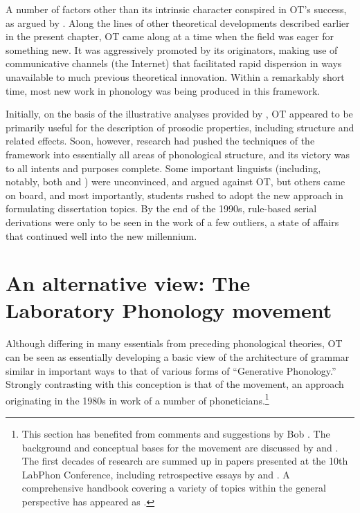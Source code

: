 A number of factors other than its intrinsic character conspired in
OT's success, as argued by \citet{griffiths19:expansion-ot}.  Along
the lines of other theoretical developments described earlier in the
present chapter, OT came along at a time when the field was eager for
something new. It was aggressively promoted by its originators, making
use of communicative channels (the Internet) that facilitated rapid
dispersion in ways unavailable to much previous theoretical
innovation.  Within a remarkably short time, most new work in
phonology was being produced in this framework.

Initially, on the basis of the illustrative analyses provided by
\citet{prince:smolensky:optimality}, OT appeared to be primarily
useful for the description of prosodic properties, including 
structure and related effects. Soon, however, research had pushed the
techniques of the framework into essentially all areas of phonological
structure, and its victory was to all intents and purposes
complete. Some important linguists (including, notably, both {\Chomsky}
and {\Halle}) were unconvinced, and argued against OT, but others came on
board, and most importantly, students rushed to adopt the new approach
in formulating dissertation topics. By the end of the 1990s,
rule-based serial derivations were only to be seen in the work of a
few outliers, a state of affairs that continued well into the new
millennium.

\section{An alternative view: The Laboratory Phonology movement}
\label{sec:labphon}

Although differing in many essentials from preceding phonological
theories, OT can be seen as essentially developing a basic view of the
architecture of grammar similar in important ways to that of various
forms of ``Generative Phonology.'' Strongly contrasting with this
conception is that of the \emph{} movement, an
approach originating in the 1980s in work of a number of phoneticians.\footnote{This section has benefited from comments and
  suggestions by Bob {\Ladd}. The background and conceptual bases for the
   movement are discussed by
  \citet{dobrovolsky94:labphon.rvw} and
  \citet{pierrehumbert.etal00:labphon}. The first decades of research
  are summed up in papers presented at the 10th LabPhon Conference,
  including retrospective essays by \citet{cohn10:labphon10.intro} and
  \citet{jbp.clopper10:what.is.labphon}. A comprehensive handbook
  covering a variety of topics within the general perspective has
  appeared as \citealt{cohn.etal11:labphon.hbk}.}


